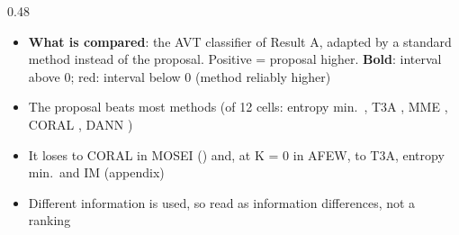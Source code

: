 \begin{frame}{}
\begin{columns}[T]
\begin{column}{0.48\textwidth}
{\begin{itemize}
\item \textbf{What is compared}: the AVT classifier of Result A, adapted by a standard method instead of the proposal. Positive = proposal higher. \textbf{Bold}: interval above 0; \textcolor{mBad}{red}: interval below 0 (method reliably higher)
\item The proposal beats most methods (of 12 cells: entropy min.\ , T3A , MME , CORAL , DANN )
\item It loses to CORAL in MOSEI () and, at K = 0 in AFEW, to T3A, entropy min.\ and IM (appendix)
\item Different information is used, so read as information differences, not a ranking
\end{itemize}
}
\end{column}
\end{columns}
{\tiny\color{mMuted}}
\end{frame}
